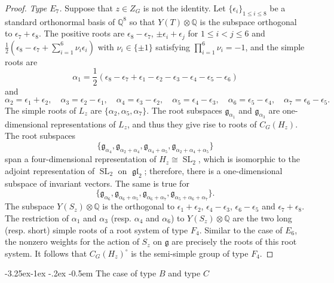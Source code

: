 \documentclass[11pt,oneside,dvipsnames]{amsart}
\makeatletter
\renewcommand\subsection{\@startsection{subsection}{3}{\z@}%
                                     {-3.25ex\@plus -1ex \@minus -.2ex}%
                                     {-0.5em}%
                                     {\normalfont\normalsize\bfseries}}
\theoremstyle{plain}
\theoremstyle{definition}
\theoremstyle{named}
\DeclareMathOperator{\gl}{\mathfrak{gl}}
\DeclareMathOperator{\SL}{SL}
\makeatother
\begin{document}
\begin{proof}
\textit{Type $E_7$.} Suppose that $z\in Z_G$ is not the identity. Let $\{\epsilon_i\}_{1\le i\le 8}$ be a standard orthonormal basis of $\mathbb{Q}^8$ so that $Y(T)\otimes\mathbb{Q}$ is the subspace orthogonal to $\epsilon_7+\epsilon_8$. The positive roots are $\epsilon_8-\epsilon_7$, $\pm\epsilon_i+\epsilon_j$ for $1\le i<j\le 6$ and $\frac{1}{2}(\epsilon_8-\epsilon_7+\sum_{i=1}^6\nu_i\epsilon_i)$ with $\nu_i\in\{\pm1\}$ satisfying $\prod_{i=1}^6\nu_i=-1$, and the simple roots are 
$$
\alpha_1=\frac{1}{2}(\epsilon_8-\epsilon_7+\epsilon_1-\epsilon_2-\epsilon_3-\epsilon_4-\epsilon_5-\epsilon_6)
$$
and 
$$
\alpha_2=\epsilon_1+\epsilon_2,\quad \alpha_3=\epsilon_2-\epsilon_1,\quad\alpha_4=\epsilon_3-\epsilon_2,\quad\alpha_5=\epsilon_4-\epsilon_3,\quad\alpha_6=\epsilon_5-\epsilon_4,\quad\alpha_7=\epsilon_6-\epsilon_5.
$$
The simple roots of $L_z$ are $\{\alpha_2,\alpha_5,\alpha_7\}$. The root subspaces $\mathfrak{g}_{\alpha_1}$ and $\mathfrak{g}_{\alpha_3}$ are one-dimensional representations of $L_z$, and thus they give rise to roots of $C_G(H_z)$. The root subspaces 
$$
\{\mathfrak{g}_{\alpha_4},\mathfrak{g}_{\alpha_2+\alpha_4},\mathfrak{g}_{\alpha_4+\alpha_5},\mathfrak{g}_{\alpha_2+\alpha_4+\alpha_5}\}
$$ 
span a four-dimensional representation of $H_z\cong \SL_2$, which is isomorphic to the adjoint representation of $\SL_2$ on $\gl_2$; therefore, there is a one-dimensional subspace of invariant vectors. The same is true for 
$$
\{\mathfrak{g}_{\alpha_6},\mathfrak{g}_{\alpha_6+\alpha_5},\mathfrak{g}_{\alpha_6+\alpha_7},\mathfrak{g}_{\alpha_5+\alpha_6+\alpha_7}\}.
$$ 
The subspace $Y(S_z)\otimes\mathbb{Q}$ is the orthogonal to $\epsilon_1+\epsilon_2$, $\epsilon_4-\epsilon_3$, $\epsilon_6-\epsilon_5$ and $\epsilon_7+\epsilon_8$. The restriction of $\alpha_1$ and $\alpha_3$ (resp. $\alpha_4$ and $\alpha_6$) to $Y(S_z)\otimes\mathbb{Q}$ are the two long (resp. short) simple roots of a root system of type $F_4$. Similar to the case of $E_6$, the nonzero weights for the action of $S_z$ on $\mathfrak{g}$ are precisely the roots of this root system. It follows that $C_G(H_z)^{\circ}$ is the semi-simple group of type $F_4$.
\end{proof}

\subsection{The case of type $B$ and type $C$}\label{subsec-type-BC}\hfill
\end{document}
